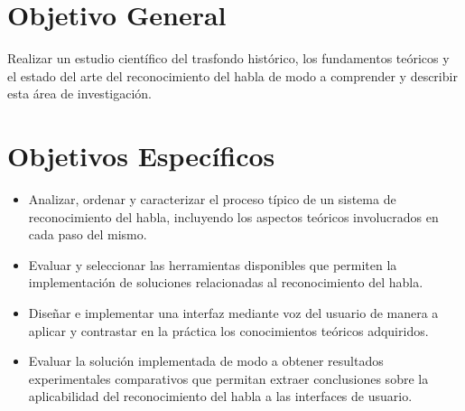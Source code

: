 \section{Objetivo General}
\label{sec:objgral}

Realizar un estudio cient\'{i}fico del trasfondo hist\'{o}rico, los fundamentos te\'{o}ricos 
y el estado del arte del reconocimiento del habla de modo a comprender y describir 
esta \'{a}rea de investigaci\'{o}n.  


\section{Objetivos Espec\'{i}ficos}
\label{sec:objspec}

\begin{itemize}
    \item Analizar, ordenar y caracterizar el proceso t\'{i}pico de un sistema de reconocimiento del habla, 
        incluyendo los aspectos te\'{o}ricos involucrados en cada paso del mismo.

    \item Evaluar y seleccionar las herramientas disponibles que permiten la implementaci\'{o}n de soluciones 
        relacionadas al reconocimiento del habla.
    
    \item Dise\~{n}ar e implementar una interfaz mediante voz del usuario de manera a aplicar y 
    contrastar en la pr\'{a}ctica los conocimientos te\'{o}ricos adquiridos.
    
    \item Evaluar la soluci\'{o}n implementada de modo a obtener resultados experimentales comparativos que 
        permitan extraer conclusiones sobre la aplicabilidad del reconocimiento del habla a las interfaces 
        de usuario.
\end{itemize}
